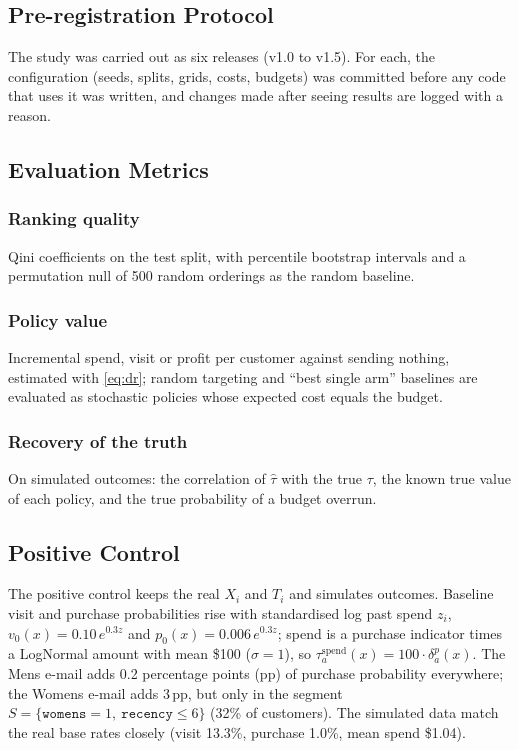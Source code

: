 \documentclass[10pt,twocolumn]{article}
\newcommand{\tauh}{\hat{\tau}}
\begin{document}
\subsection{Pre-registration Protocol}
The study was carried out as six releases (v1.0 to v1.5). For each, the configuration (seeds,
splits, grids, costs, budgets) was committed before any code that uses it was written, and changes
made after seeing results are logged with a reason.

\subsection{Evaluation Metrics}
\subsubsection{Ranking quality}
Qini coefficients on the test split, with percentile bootstrap intervals \citep{efron1993} and a
permutation null of 500 random orderings as the random baseline.
\subsubsection{Policy value}
Incremental spend, visit or profit per customer against sending nothing, estimated with
\eqref{eq:dr}; random targeting and ``best single arm'' baselines are evaluated as stochastic
policies whose expected cost equals the budget.
\subsubsection{Recovery of the truth}
On simulated outcomes: the correlation of $\tauh$ with the true $\tau$, the known true value of each
policy, and the true probability of a budget overrun.

\subsection{Positive Control}
\label{sec:pc}
The positive control keeps the real $X_i$ and $T_i$ and simulates outcomes. Baseline visit and
purchase probabilities rise with standardised log past spend $z_i$, $v_0(x)=0.10\,e^{0.3z}$ and
$p_0(x)=0.006\,e^{0.3z}$; spend is a purchase indicator times a LogNormal amount with mean \$100
($\sigma=1$), so $\tau^{\text{spend}}_a(x) = 100\cdot\delta^{p}_a(x)$. The Mens e-mail adds 0.2
percentage points (pp) of purchase probability everywhere; the Womens e-mail adds 3\,pp, but only in
the segment $S=\{\texttt{womens}=1,\ \texttt{recency}\le 6\}$ (32\% of customers). The simulated data
match the real base rates closely (visit 13.3\%, purchase 1.0\%, mean spend \$1.04).
\end{document}
